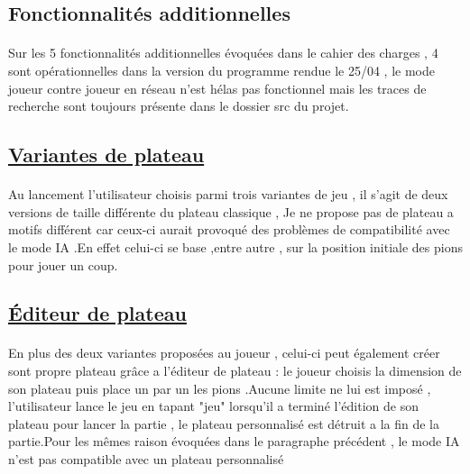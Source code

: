 \documentclass[a4paper,12pt]{article}
\begin{document}
\newpage
\begin{center}
\section{Fonctionnalités additionnelles}
\end{center}
\vspace{1cm}
\paragraph{}
Sur les 5 fonctionnalités additionnelles évoquées dans le cahier des charges , 4 sont opérationnelles dans la version du programme rendue le 25/04 , le mode joueur contre joueur en réseau n'est hélas pas fonctionnel mais les traces de recherche sont toujours présente dans le dossier src du projet.

\subsection{\underline{Variantes de plateau}}
\paragraph{}
Au lancement l'utilisateur choisis parmi trois variantes de jeu , il s'agit de deux versions de taille différente du plateau classique , Je ne propose pas de plateau a motifs différent car ceux-ci aurait provoqué des problèmes de compatibilité avec le mode IA .En effet celui-ci se base ,entre autre , sur la position initiale des pions pour jouer un coup.

\subsection{\underline{Éditeur de plateau}}
\paragraph{}
En plus des deux variantes proposées au joueur , celui-ci peut également créer sont propre plateau grâce a l'éditeur de plateau : le joueur choisis la dimension de son plateau puis place un par un les pions .Aucune limite ne lui est imposé , l'utilisateur lance le jeu en tapant "jeu" lorsqu'il a terminé l'édition de son plateau pour lancer la partie , le plateau personnalisé est détruit a la fin de la partie.Pour les mêmes raison évoquées dans le paragraphe précédent , le mode IA n'est pas compatible avec un plateau personnalisé
\end{document}
